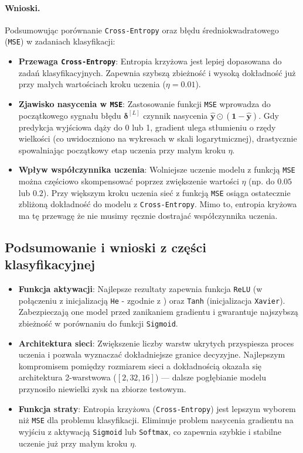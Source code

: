 \documentclass[11pt,a4paper]{article}
\begin{document}
\paragraph{Wnioski.}
Podsumowując porównanie \texttt{Cross-Entropy} oraz błędu średniokwadratowego (\texttt{MSE}) w zadaniach klasyfikacji:
\begin{itemize}
    \item \textbf{Przewaga \texttt{Cross-Entropy}}: Entropia krzyżowa jest lepiej dopasowana do zadań klasyfikacyjnych. Zapewnia szybszą zbieżność i wysoką dokładność już przy małych wartościach kroku uczenia ($\eta = 0.01$). 
    \item \textbf{Zjawisko nasycenia w \texttt{MSE}}: Zastosowanie funkcji \texttt{MSE} wprowadza do początkowego sygnału błędu $\boldsymbol{\delta}^{[L]}$ czynnik nasycenia $\hat{\boldsymbol{y}} \odot (\mathbf{1} - \hat{\boldsymbol{y}})$. Gdy predykcja wyjściowa dąży do 0 lub 1, gradient ulega stłumieniu o rzędy wielkości (co uwidoczniono na wykresach w skali logarytmicznej), drastycznie spowalniając początkowy etap uczenia przy małym kroku $\eta$.
    \item \textbf{Wpływ współczynnika uczenia}: Wolniejsze uczenie modelu z funkcją \texttt{MSE} można częściowo skompensować poprzez zwiększenie wartości $\eta$ (np. do $0.05$ lub $0.2$). Przy większym kroku uczenia sieć z funkcją \texttt{MSE} osiąga ostatecznie zbliżoną dokładność do modelu z \texttt{Cross-Entropy}. Mimo to, entropia kryżowa ma tę przewagę że nie musimy ręcznie dostrajać współczynnika uczenia.
\end{itemize}

\subsection{Podsumowanie i wnioski z części klasyfikacyjnej}

\begin{itemize}
    \item \textbf{Funkcja aktywacji}: Najlepsze rezultaty zapewnia funkcja \texttt{ReLU} (w połączeniu z inicjalizacją \texttt{He} - zgodnie z \cite{he_xavier_init})
    oraz \texttt{Tanh} (inicjalizacja \texttt{Xavier}). Zabezpieczają one model przed zanikaniem gradientu i gwarantuje najszybszą zbieżność w porównaniu do funkcji \texttt{Sigmoid}.
    \item \textbf{Architektura sieci}: Zwiększenie liczby warstw ukrytych przyspiesza proces uczenia i pozwala wyznaczać dokładniejsze granice decyzyjne.
    Najlepszym kompromisem pomiędzy rozmiarem sieci a dokładnością okazała się architektura 2-warstwowa ($[2, 32, 16]$) — dalsze pogłębianie modelu przynosiło niewielki zysk na zbiorze testowym.
    \item \textbf{Funkcja straty}: Entropia krzyżowa (\texttt{Cross-Entropy}) jest lepszym wyborem niż \texttt{MSE} dla problemu klasyfikacji.
    Eliminuje problem nasycenia gradientu na wyjściu z aktywacją \texttt{Sigmoid} lub \texttt{Softmax}, co zapewnia szybkie i stabilne uczenie już przy małym kroku $\eta$.
\end{itemize}
\end{document}
